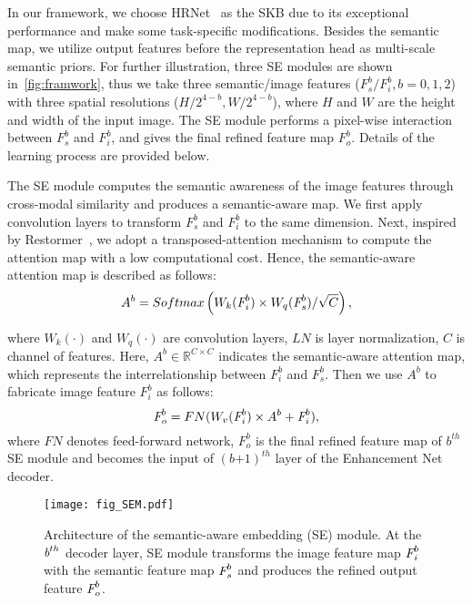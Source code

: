 \documentclass[10pt,twocolumn,letterpaper]{article}
\begin{document}
In our framework, we choose HRNet~\cite{wang2020hrnet} as the SKB due to its exceptional performance and make some task-specific modifications. Besides the semantic map, we utilize output features before the representation head as multi-scale semantic priors. For further illustration, three SE modules are shown in~\cref{fig:framwork}, thus we take three semantic/image features ($\textit{F}_s^b / \textit{F}_i^b,b=0,1,2$) with three spatial resolutions ($\textit{H}/2^{4-b}, \textit{W}/2^{4-b}$), where $\textit{H}$ and $\textit{W}$ are the height and width of the input image. The SE module performs a pixel-wise interaction between $\textit{F}_s^b$ and $\textit{F}_i^b$, and gives the final refined feature map $\textit{F}_o^b$. Details of the learning process are provided below.

The SE module computes the semantic awareness of the image features through cross-modal similarity and produces a semantic-aware map. We first apply convolution layers to transform $\textit{F}_s^b$ and $\textit{F}_i^b$ to the same dimension. Next, inspired by Restormer~\cite{zamir2022restormer}, we adopt a transposed-attention mechanism to compute the attention map with a low computational cost. Hence, the semantic-aware attention map is described as follows:
\vspace{-0.1cm}
\begin{equation}
  A^b = Softmax\left(W_k(\textit{F}_i^{b}) \times W_q(\textit{F}_s^{ b})/\sqrt{C}\right),
  \label{eq:msa1}
  \vspace{-0.1cm}
\end{equation}

where $W_k(\cdot)$ and $W_q(\cdot)$ are convolution layers, $LN$ is layer normalization, $C$ is channel of features. Here, $A^b\in\mathbb{R}^{C\times C}$ indicates the semantic-aware attention map, which represents the interrelationship between $\textit{F}_i^b$ and $\textit{F}_s^b$. Then we use $A^b$ to fabricate image feature $\textit{F}_i^b$ as follows:
\vspace{-0.1cm}
\begin{equation}
  \textit{F}_o^b = FN(W_v(\textit{F}_i^b) \times A^b + \textit{F}_i^b),
  \label{eq:msa2}
  \vspace{-0.1cm}
\end{equation}
where $FN$ denotes feed-forward network, $\textit{F}_o^b$ is the final refined feature map of $b^{th}$ SE module and becomes the input of ${(b\mathit{+}1)}^{th}$ layer of the Enhancement Net decoder.

\begin{figure}[t]
  \centering
   \texttt{[image: fig\_SEM.pdf]}
   \setlength{\abovecaptionskip}{-0.3cm}
   \setlength{\belowcaptionskip}{-0.5cm}
   \caption{Architecture of the semantic-aware embedding (SE) module. At the $ \textit b^{th} $ decoder layer, SE module transforms the image feature map $\textit F_{i}^{b} $ with the semantic feature map $\textit F_{s}^{b} $ and produces the refined output feature $\textit F_{o}^{b} $.}
   \label{fig:msam}
\end{figure}
\end{document}
